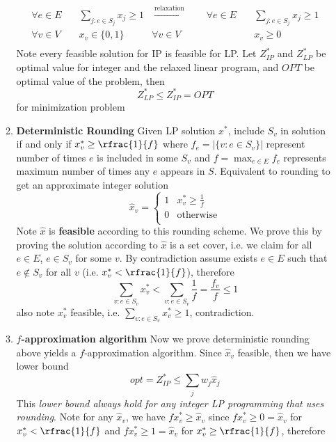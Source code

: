 \documentclass[11pt]{article}
\begin{document}
\begin{enumerate}
\begin{enumerate}
\begin{align*}
            \forall e\in E \quad & \sum_{j: e\in S_j} x_j \geq 1 
            &   \overset{\text{relaxation}}{\longrightarrow} \quad \quad 
            \forall e\in E \quad & \sum_{j: e\in S_j} x_j \geq 1 
            \\
            \forall v\in V \quad & x_v \in \{0, 1 \} 
            & 
            \forall v\in V \quad & x_v \geq 0
            \\ 
        \end{align*}
        Note every feasible solution for IP is feasible for LP. Let $Z_{IP}^*$ and $Z_{LP}^*$ be optimal value for integer and the relaxed linear program, and $OPT$ be optimal value of the problem, then 
        \[
            Z_{LP}^* \leq Z_{IP}^* = OPT 
        \]
        for minimization problem
        \item \textbf{Deterministic Rounding} Given LP solution $x^*$, include $S_v$ in solution if and only if $x_v^* \geq \rfrac{1}{f}$ where $f_e = |\{ v : e\in S_v \}|$ represent number of times $e$ is included in some $S_v$ and $f = \max_{e\in E} f_e$ represents maximum number of times any $e$ appears in $S$. Equivalent to rounding to get an approximate integer solution
        \[
            \hat{x}_v = 
            \begin{cases}
                1 & x_v^* \geq \frac{1}{f} \\
                0 & \text{otherwise} \\ 
            \end{cases}    
        \]
        Note $\hat{x}$ is \textbf{feasible} according to this rounding scheme. We prove this by proving the solution according to $\hat{x}$ is a set cover, i.e. we claim for all $e\in E$, $e\in S_v$ for some $v$. By contradiction assume exists $e\in E$ such that $e\not\in S_v$ for all $v$ (i.e. $x_v^* < \rfrac{1}{f}$), therefore 
        \[
            \sum_{v:e\in S_v} x_v^*
            < \sum_{v:e\in S_v} \frac{1}{f}
            = \frac{f_v}{f} 
            \leq 1
        \]
        also note $x_v^*$ feasible, i.e. $\textstyle \sum_{v:e\in S_v} x_v^* \geq 1$, contradiction. 
        \item \textbf{$f$-approximation algorithm} Now we prove deterministic rounding above yields a $f$-approximation algorithm. Since $\hat{x}_v$ feasible, then we have lower bound 
        \[
            opt = Z_{IP}^* \leq \sum_{j} w_j \hat{x}_j
        \]
        This \textit{lower bound always hold for any integer LP programming that uses rounding}. Note for any $\hat{x}_v$, we have $f x_v^* \geq \hat{x}_v$ since $f x_v^* \geq 0 = \hat{x}_v$ for $x_v^* < \rfrac{1}{f}$ and $f x_v^* \geq 1 = \hat{x}_v$ for $x_v^* \geq \rfrac{1}{f}$, therefore 

\end{enumerate}
\end{enumerate}
\end{document}
